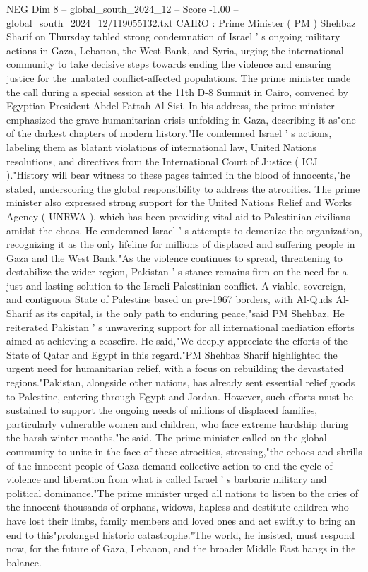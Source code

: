 \begin{textsample}{NEG Dim 8 – global\_south\_2024\_12 – Score -1.00 – global\_south\_2024\_12/119055132.txt}  \label{ex:f8_neg_378}
CAIRO : Prime Minister ( PM ) Shehbaz Sharif on Thursday tabled strong condemnation of Israel ' s ongoing military actions in Gaza, Lebanon, the West Bank, and Syria, urging the international community to take decisive steps towards ending the violence and ensuring justice for the unabated conflict-affected populations.
The prime minister made the call during a special session at the 11th D-8 Summit in Cairo, convened by Egyptian President Abdel Fattah Al-Sisi.
In his address, the prime minister emphasized the grave humanitarian crisis unfolding in Gaza, describing it as"one of the darkest chapters of modern history."He condemned Israel ' s actions, labeling them as blatant violations of international law, United Nations resolutions, and directives from the International Court of Justice ( ICJ )."History will bear witness to these pages tainted in the blood of innocents,"he stated, underscoring the global responsibility to address the atrocities.
The prime minister also expressed strong support for the United Nations Relief and Works Agency ( UNRWA ), which has been providing vital aid to Palestinian civilians amidst the chaos.
He condemned Israel ' s attempts to demonize the organization, recognizing it as the only lifeline for millions of displaced and suffering people in Gaza and the West Bank."As the violence continues to spread, threatening to destabilize the wider region, Pakistan ' s stance remains firm on the need for a just and lasting solution to the Israeli-Palestinian conflict.
A viable, sovereign, and contiguous State of Palestine based on pre-1967 borders, with Al-Quds Al-Sharif as its capital, is the only path to enduring peace,"said PM Shehbaz.
He reiterated Pakistan ' s unwavering support for all international mediation efforts aimed at achieving a ceasefire.
He said,"We deeply appreciate the efforts of the State of Qatar and Egypt in this regard."PM Shehbaz Sharif highlighted the urgent need for humanitarian relief, with a focus on rebuilding the devastated regions."Pakistan, alongside other nations, has already sent essential relief goods to Palestine, entering through Egypt and Jordan.
However, such efforts must be sustained to support the ongoing needs of millions of displaced families, particularly vulnerable women and children, who face extreme hardship during the harsh winter months,"he said.
The prime minister called on the global community to unite in the face of these atrocities, stressing,"the echoes and shrills of the innocent people of Gaza demand collective action to end the cycle of violence and liberation from what is called Israel ' s barbaric military and political dominance."The prime minister urged all nations to listen to the cries of the innocent thousands of orphans, widows, hapless and destitute children who have lost their limbs, family members and loved ones and act swiftly to bring an end to this"prolonged historic catastrophe."The world, he insisted, must respond now, for the future of Gaza, Lebanon, and the broader Middle East hangs in the balance.

\end{textsample}
